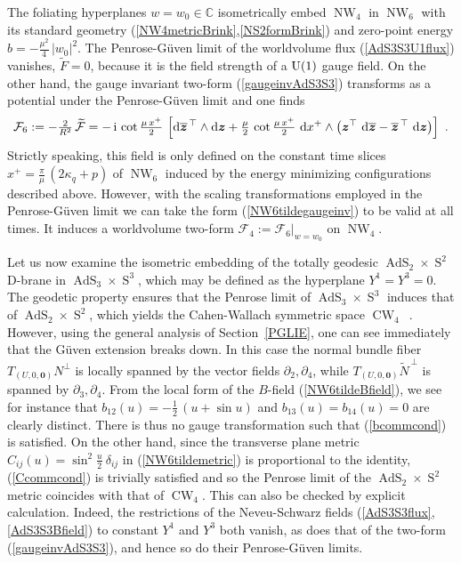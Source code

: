 \documentclass[11pt,a4paper]{article}
\DeclareMathOperator{\AdS}{AdS}
\DeclareMathOperator{\Sphere}{S}
\DeclareMathOperator{\NW}{NW}
\DeclareMathOperator{\CW}{CW}
\let\S\Sphere
\newcommand{\ii}{{\rm i}}
\newcommand{\mbf}[1]{{\boldsymbol {#1} }}
\def\ii{{\,{\rm i}\,}}
\def\dd{{\rm d}}
\def\mz{{\mbf z}}
\newcommand{\complex}{{\mathbb C}} %
\newcommand{\beq}{\begin{eqnarray}}
\newcommand{\eeq}{\end{eqnarray}}
\begin{document}
The foliating hyperplanes $w=w_0\in\complex$ isometrically embed
$\NW_4$ in $\NW_6$ with its standard geometry
(\ref{NW4metricBrink},\ref{NS2formBrink}) and zero-point energy
$b=-\frac{\mu^2}4\,|w_0|^2$. The Penrose-G\"uven limit of the
worldvolume flux (\ref{AdS3S3U1flux}) vanishes, $\widetilde{F}=0$,
because it is the field strength of a ${\rm U}(1)$ gauge field. On the
other hand, the gauge invariant two-form (\ref{gaugeinvAdS3S3})
transforms as a potential under the Penrose-G\"uven limit and one
finds
\beq
\mathcal{F}_6:=-\mbox{$\frac2{R^2}$}\,\widetilde{\mathcal{F}}=-\ii
\cot\mbox{$\frac{\mu\,x^+}2$}\,\left[\dd\overline{\mz}^{\,\top}
\wedge\dd\mz+\mbox{$\frac\mu2$}\,\cot\mbox{$\frac{\mu\,x^+}2$}~
\dd x^+\wedge\left(\mz^\top~\dd\overline{\mz}-\overline{\mz}^{\,\top}~
\dd\mz\right)\right] \ .
\label{NW6tildegaugeinv}\eeq
Strictly speaking, this field is only defined on the constant time
slices $x^+=\frac\pi\mu\,(2\kappa_q+p)$ of $\NW_6$ induced by the
energy minimizing configurations described above. However, with the
scaling transformations employed in the Penrose-G\"uven limit we can
take the form (\ref{NW6tildegaugeinv}) to be valid at all times. It
induces a worldvolume two-form $\mathcal{F}_4:=\mathcal{F}_6|_{w=w_0}$
on $\NW_4$.

Let us now examine the isometric embedding of the totally geodesic
$\AdS_2\times\S^2$ D-brane in $\AdS_3\times\S^3$, which may be
defined as the hyperplane $Y^1=Y^3=0$. The geodetic property
ensures that the Penrose limit of $\AdS_3\times\S^3$ induces that of
$\AdS_2\times\S^2$, which yields the Cahen-Wallach symmetric space
$\CW_4$~\cite{BFP1}. However, using the general analysis of
Section~\ref{PGLIE}, one can see immediately that the G\"uven
extension breaks down. In this case the normal bundle fiber
$T_{(U,0,\mbf0)}N^\perp$ is locally spanned by the vector fields
$\partial_2,\partial_4$, while $T_{(U,0,\mbf0)}\widetilde{N}^{\,\perp}$ is
spanned by $\partial_3,\partial_4$. From the local form of the
$B$-field (\ref{NW6tildeBfield}), we see for instance that
$b_{12}(u)=-\frac12\,(u+\sin u)$ and $b_{13}(u)=b_{14}(u)=0$ are
clearly distinct. There is thus no gauge transformation such that
(\ref{bcommcond}) is satisfied. On the other hand, since the
transverse plane metric $C_{ij}(u)=\sin^2\frac u2~\delta_{ij}$
in (\ref{NW6tildemetric}) is proportional to the identity,
(\ref{Ccommcond}) is trivially satisfied and so the Penrose limit of
the $\AdS_2\times\S^2$ metric coincides with that of $\CW_4$. This can
also be checked by explicit calculation. Indeed, the restrictions of
the Neveu-Schwarz fields (\ref{AdS3S3flux},\ref{AdS3S3Bfield}) to
constant $Y^1$ and $Y^3$ both vanish, as does that of the two-form
(\ref{gaugeinvAdS3S3}), and hence so do their Penrose-G\"uven limits.
\end{document}
